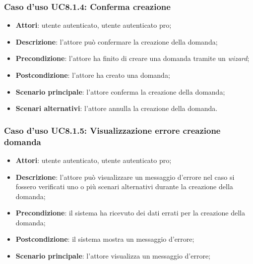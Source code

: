 	\subsubsection{Caso d'uso UC8.1.4: Conferma creazione}
	\begin{itemize}
		\item
			\textbf{Attori}: utente autenticato, utente autenticato pro;
		\item
			\textbf{Descrizione}: l'attore può confermare la creazione della domanda;
		\item		
			\textbf{Precondizione}: l'attore ha finito di creare una domanda tramite un \textit{wizard};
		\item
			\textbf{Postcondizione}: l'attore ha creato una domanda;
		\item
			\textbf{Scenario principale}: l'attore conferma la creazione della domanda;		
		\item
	 		\textbf{Scenari alternativi}: l'attore annulla la creazione della domanda.
					
	\end{itemize}	
	
	\subsubsection{Caso d'uso UC8.1.5: Visualizzazione errore creazione domanda}
	\begin{itemize}
		\item
			\textbf{Attori}: utente autenticato, utente autenticato pro;
		\item
			\textbf{Descrizione}: l'attore può visualizzare un messaggio d'errore nel caso si fossero verificati uno o più scenari alternativi durante la creazione della domanda;
		\item		
			\textbf{Precondizione}: il sistema ha ricevuto dei dati errati per la creazione della domanda;
		\item
			\textbf{Postcondizione}: il sistema mostra un messaggio d'errore;
		\item
			\textbf{Scenario principale}: l'attore visualizza un messaggio d'errore;	
	\end{itemize}	


